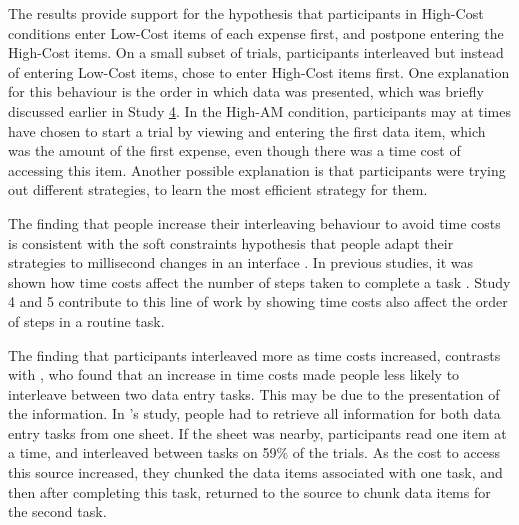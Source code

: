 The results provide support for the hypothesis that participants in High-Cost conditions enter Low-Cost items of each expense first, and postpone entering the High-Cost items. On a small subset of trials, participants interleaved but instead of entering Low-Cost items, chose to enter High-Cost items first. One explanation for this behaviour is the order in which data was presented, which was briefly discussed earlier in Study \hyperref[st:Study4]{4}. In the High-AM condition, participants may at times have chosen to start a trial by viewing and entering the first data item, which was the amount of the first expense, even though there was a time cost of accessing this item. Another possible explanation is that participants were trying out different strategies, to learn the most efficient strategy for them. 


The finding that people increase their interleaving behaviour to avoid time costs is consistent with the soft constraints hypothesis that people adapt their strategies to millisecond changes in an interface \citep{Charman2003, Gray2004}. In previous studies, it was shown how time costs affect the number of steps taken to complete a task \citep{Gray2006}. Study 4 and 5 contribute to this line of work by showing time costs also affect the order of steps in a routine task.

The finding that participants interleaved more as time costs increased, contrasts with \citet{Back2012}, who found that an increase in time costs made people less likely to interleave between two data entry tasks. This may be due to the presentation of the information. In \citet{Back2012}'s study, people had to retrieve all information for both data entry tasks from one sheet. If the sheet was nearby, participants read one item at a time, and interleaved between tasks on 59\% of the trials.  As the cost to access this source increased, they chunked the data items associated with one task, and then after completing this task, returned to the source to chunk data items for the second task. 


